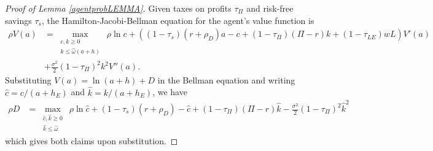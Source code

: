 \documentclass[11pt]{article}
\theoremstyle{plain}
\theoremstyle{definition} %
\begin{document}
\begin{proof}[Proof of Lemma \ref{agentprobLEMMA}] \label{agentprobproof}
Given taxes on profits $\tau_{\Pi}$ and risk-free savings $\tau_{s}$, the Hamilton-Jacobi-Bellman equation for the agent's value function is 
\begin{align*}
\rho V(a) & = \max_{\substack{c,k \geq 0 \\ k \leq \hat{\omega}(a+h)}} \ \rho \ln c + {\left((1-\tau_s)(r+\rho_D)a - c + (1-\tau_{\Pi})(\Pi - r)k + (1-\tau_{LE})wL\right)}V'(a) 
\\ & + \frac{\sigma^2}{2} (1-\tau_{\Pi})^2k^2V''(a).
\end{align*}
Substituting $V(a) = \ln (a + h) + D$ in the Bellman equation and writing $\hat{c} = c/(a+h_E)$ and $\hat{k} = k/(a+h_E)$, we have 
\begin{align*}
\rho D & = \max_{\substack{\hat{c},\hat{k} \geq 0 \\ \hat{k} \leq \hat{\omega}}} \ \rho \ln \hat{c} + (1-\tau_s)(r+\rho_D) - \hat{c} + (1-\tau_{\Pi})(\Pi - r)\hat{k} - \frac{\sigma^2}{2} (1-\tau_{\Pi})^2\hat{k}^2
\end{align*}
which gives both claims upon substitution. 
\end{proof}
\end{document}
